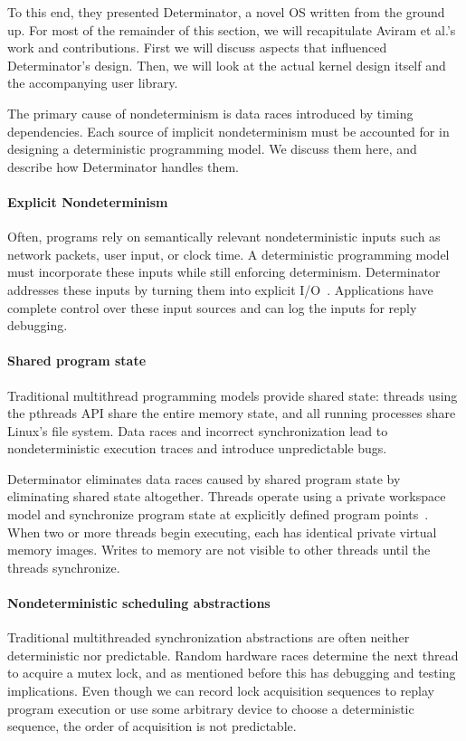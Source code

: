 To this end, they presented Determinator, a novel OS written from the ground up.
For most of the remainder of this section, we will recapitulate Aviram et al.'s
work and contributions. First we will discuss aspects that influenced
Determinator's design. Then, we will look at the actual kernel design itself
and the accompanying user library.

The primary cause of nondeterminism is data races introduced by timing
dependencies. Each source of implicit nondeterminism must be accounted for in
designing a deterministic programming model. We discuss them here, and describe
how Determinator handles them.

\paragraph{Explicit Nondeterminism}
Often, programs rely on semantically relevant nondeterministic inputs such as
network packets, user input, or clock time. A deterministic programming model
must incorporate these inputs while still enforcing determinism. Determinator
addresses these inputs by turning them into explicit I/O~\cite{Aviram10}.
Applications have complete control over these input sources and can log the
inputs for reply debugging.

\paragraph{Shared program state}
Traditional multithread programming models provide shared state: threads using
the pthreads API share the entire memory state, and all running processes share
Linux's file system. Data races and incorrect synchronization lead
to nondeterministic execution traces and introduce unpredictable bugs.

Determinator eliminates data races caused by shared program state by eliminating
shared state altogether. Threads operate using a private workspace model and
synchronize program state at explicitly defined program points~\cite{Aviram10}.
When two or more
threads begin executing, each has identical private virtual memory images.
Writes to memory are not visible to other threads until the threads synchronize.

\paragraph{Nondeterministic scheduling abstractions}
Traditional multithreaded synchronization abstractions are often neither
deterministic nor predictable. Random hardware races determine the next thread to
acquire a mutex lock, and as mentioned before this has debugging and testing
implications. Even though we can record lock acquisition sequences to replay
program execution or use some arbitrary device to choose a deterministic
sequence, the order of acquisition is not predictable.

